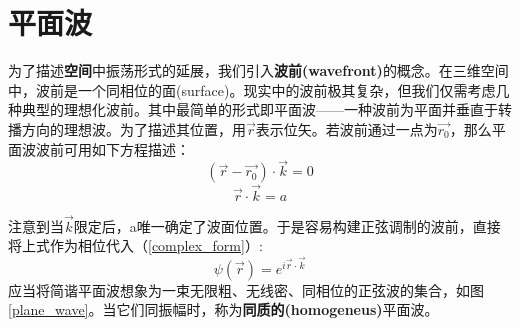 \documentclass[12pt]{ctexart}%
\begin{document}
\section*{平面波}
为了描述\textbf{空间}中振荡形式的延展，我们引入\textbf{波前(wavefront)}的概念。在三维空间中，波前是一个同相位的面(surface)。现实中的波前极其复杂，但我们仅需考虑几种典型的理想化波前。其中最简单的形式即平面波——一种波前为平面并垂直于转播方向的理想波。为了描述其位置，用$\vec{r}$表示位矢。若波前通过一点为$\vec{r_0}$，那么平面波波前可用如下方程描述：
\begin{equation}
    (\vec{r}-\vec{r_0})\cdot\vec{k}=0
\end{equation}
\begin{equation}
    \vec{r}\cdot\vec{k}=a
\end{equation}
\par 注意到当$\vec{k}$限定后，a唯一确定了波面位置。于是容易构建正弦调制的波前，直接将上式作为相位代入（\ref{complex_form}）:
\begin{equation}
    \psi(\vec{r})=e^{i\vec{r}\cdot\vec{k}}
    \label{complex_planewave}
\end{equation}
应当将简谐平面波想象为一束无限粗、无线密、同相位的正弦波的集合，如图\ref{plane_wave}。当它们同振幅时，称为\textbf{同质的(homogeneus)}平面波。
\end{document}
